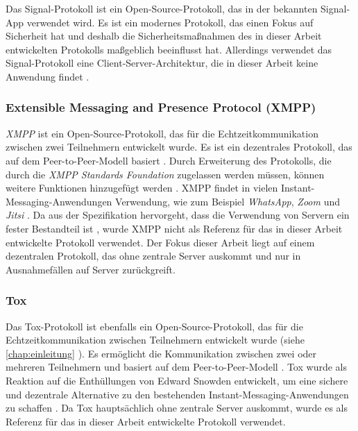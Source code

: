 Das Signal-Protokoll ist ein Open-Source-Protokoll, das in der bekannten Signal-App verwendet wird. Es ist ein modernes Protokoll, das einen Fokus auf Sicherheit hat \parencite{Signal_website} und deshalb die Sicherheitsmaßnahmen des in dieser Arbeit entwickelten Protokolls maßgeblich beeinflusst hat. Allerdings verwendet das Signal-Protokoll eine Client-Server-Architektur, die in dieser Arbeit keine Anwendung findet \parencite{Github_libsignal}.

\subsubsection{Extensible Messaging and Presence Protocol (XMPP)}
\label{subsubsection:xmpp}

\textit{XMPP} ist ein Open-Source-Protokoll, das für die Echtzeitkommunikation zwischen zwei Teilnehmern entwickelt wurde. Es ist ein dezentrales Protokoll, das auf dem Peer-to-Peer-Modell basiert \parencite{rfc6120_XMPP}. Durch Erweiterung des Protokolls, die durch die \textit{XMPP Standards Foundation} zugelassen werden müssen, können weitere Funktionen hinzugefügt werden \parencite{xmpp_extensions}. XMPP findet in vielen Instant-Messaging-Anwendungen Verwendung, wie zum Beispiel \textit{WhatsApp}, \textit{Zoom} und \textit{Jitsi} \parencite{xmpp_im}. Da aus der Spezifikation hervorgeht, dass die Verwendung von Servern ein fester Bestandteil ist \parencite{rfc6120_XMPP}, wurde XMPP nicht als Referenz für das in dieser Arbeit entwickelte Protokoll verwendet. Der Fokus dieser Arbeit liegt auf einem dezentralen Protokoll, das ohne zentrale Server auskommt und nur in Ausnahmefällen auf Server zurückgreift.


\subsubsection{Tox}
\label{subsubsection:tox}

Das Tox-Protokoll ist ebenfalls ein Open-Source-Protokoll, das für die Echtzeitkommunikation zwischen Teilnehmern entwickelt wurde (siehe \ref{chap:einleitung} \textit{}). Es ermöglicht die Kommunikation zwischen zwei oder mehreren Teilnehmern und basiert auf dem Peer-to-Peer-Modell \parencite{Tox_FAQ}. Tox wurde als Reaktion auf die Enthüllungen von Edward Snowden entwickelt, um eine sichere und dezentrale Alternative zu den bestehenden Instant-Messaging-Anwendungen zu schaffen \parencite{tox_about}. Da Tox hauptsächlich ohne zentrale Server auskommt, wurde es als Referenz für das in dieser Arbeit entwickelte Protokoll verwendet.



